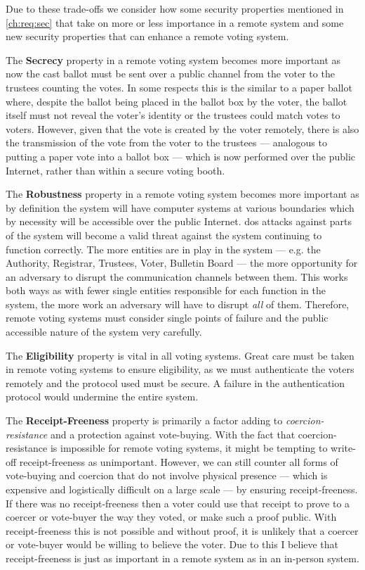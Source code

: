 Due to these trade-offs we consider how some security properties mentioned in \autoref{ch:req:sec} that take on more or less importance in a remote system and some new security properties that can enhance a remote voting system.

The \textbf{Secrecy} property in a remote voting system becomes more important as now the cast ballot must be sent over a public channel from the voter to the trustees counting the votes. In some respects this is the similar to a paper ballot where, despite the ballot being placed in the ballot box by the voter, the ballot itself must not reveal the voter's identity or the trustees could match votes to voters. However, given that the vote is created by the voter remotely, there is also the transmission of the vote from the voter to the trustees --- analogous to putting a paper vote into a ballot box --- which is now performed over the public Internet, rather than within a secure voting booth.

The \textbf{Robustness} property in a remote voting system becomes more important as by definition the system will have computer systems at various boundaries which by necessity will be accessible over the public Internet. \Gls{dos} attacks against parts of the system will become a valid threat against the system continuing to function correctly. The more entities are in play in the system --- e.g. the Authority, Registrar, Trustees, Voter, Bulletin Board --- the more opportunity for an adversary to disrupt the communication channels between them. This works both ways as with fewer single entities responsible for each function in the system, the more work an adversary will have to disrupt \emph{all} of them. Therefore, remote voting systems must consider single points of failure and the public accessible nature of the system very carefully.

The \textbf{Eligibility} property is vital in all voting systems. Great care must be taken in remote voting systems to ensure eligibility, as we must authenticate the voters remotely and the protocol used must be secure. A failure in the authentication protocol would undermine the entire system. 

The \textbf{Receipt-Freeness} property is primarily a factor adding to \emph{coercion-resistance} and a protection against vote-buying. With the fact that coercion-resistance is impossible for remote voting systems, it might be tempting to write-off receipt-freeness as unimportant. However, we can still counter all forms of vote-buying and coercion that do not involve physical presence --- which is expensive and logistically difficult on a large scale --- by ensuring receipt-freeness. If there was no receipt-freeness then a voter could use that receipt to prove to a coercer or vote-buyer the way they voted, or make such a proof public. With receipt-freeness this is not possible and without proof, it is unlikely that a coercer or vote-buyer would be willing to believe the voter. Due to this I believe that receipt-freeness is just as important in a remote system as in an in-person system.

